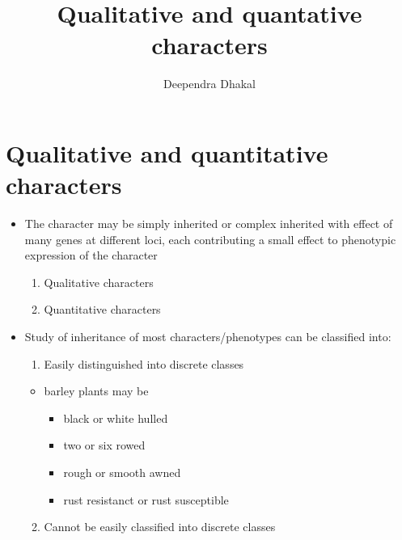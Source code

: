 \documentclass[11pt,ignorenonframetext,aspectratio=169]{beamer}
\title[]{Qualitative and quantative characters}
\author[
        Deependra Dhakal
    ]{Deependra Dhakal}
\institute[
    ]{
    Agriculture and Forestry University\\
\textit{ddhakal.rookie@gmail.com}\\
\url{https://rookie.rbind.io}
    }
\date[
      
  ]{
    }
\providecommand{\tightlist}{%
  \setlength{\itemsep}{0pt}\setlength{\parskip}{0pt}}
\begin{document}
  \begin{frame}[plain]
  \titlepage
  \end{frame}



\hypertarget{qualitative-and-quantitative-characters}{%
\section{Qualitative and quantitative
characters}\label{qualitative-and-quantitative-characters}}

\begin{frame}{}
\protect\hypertarget{section}{}
\begin{itemize}
\tightlist
\item
  The character may be simply inherited or complex inherited with effect
  of many genes at different loci, each contributing a small effect to
  phenotypic expression of the character

  \begin{enumerate}
  \tightlist
  \item
    Qualitative characters
  \item
    Quantitative characters
  \end{enumerate}
\item
  Study of inheritance of most characters/phenotypes can be classified
  into:

  \begin{enumerate}
  \tightlist
  \item
    Easily distinguished into discrete classes
  \end{enumerate}

  \begin{itemize}
  \tightlist
  \item
    barley plants may be

    \begin{itemize}
    \tightlist
    \item
      black or white hulled
    \item
      two or six rowed
    \item
      rough or smooth awned
    \item
      rust resistanct or rust susceptible
    \end{itemize}
  \end{itemize}

  \begin{enumerate}
  \setcounter{enumi}{1}
  \tightlist
  \item
    Cannot be easily classified into discrete classes
  \end{enumerate}


\end{itemize}
\end{frame}
\end{document}
